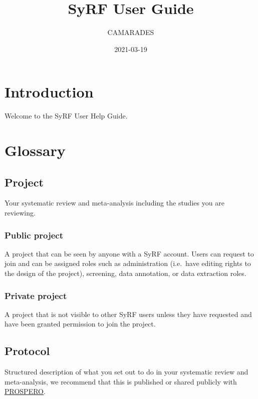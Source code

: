 \documentclass[
]{book}
\title{SyRF User Guide}
\author{CAMARADES}
\date{2021-03-19}
\begin{document}
\maketitle

{
\setcounter{tocdepth}{1}
\tableofcontents
}
\hypertarget{index}{%
\chapter{Introduction}\label{index}}

Welcome to the SyRF User Help Guide.

\hypertarget{glossary}{%
\chapter{Glossary}\label{glossary}}

\hypertarget{project}{%
\section{Project}\label{project}}

Your systematic review and meta-analysis including the studies you are reviewing.

\hypertarget{public-project}{%
\subsection{Public project}\label{public-project}}

A project that can be seen by anyone with a SyRF account. Users can request to join and can be assigned roles such as administration (i.e.~have editing rights to the design of the project), screening, data annotation, or data extraction roles.

\hypertarget{private-project}{%
\subsection{Private project}\label{private-project}}

A project that is not visible to other SyRF users unless they have requested and have been granted permission to join the project.

\hypertarget{protocol}{%
\section{Protocol}\label{protocol}}

Structured description of what you set out to do in your systematic review and meta-analysis, we recommend that this is published or shared publicly with \href{https://www.crd.york.ac.uk/prospero/}{PROSPERO}.
\end{document}
